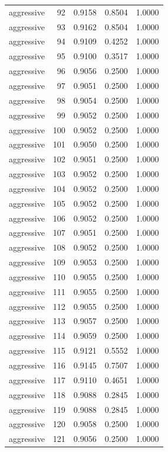 \begin{tabular}{lrrrr}
aggressive & 92 & 0.9158 & 0.8504 & 1.0000 \\
aggressive & 93 & 0.9162 & 0.8504 & 1.0000 \\
aggressive & 94 & 0.9109 & 0.4252 & 1.0000 \\
aggressive & 95 & 0.9100 & 0.3517 & 1.0000 \\
aggressive & 96 & 0.9056 & 0.2500 & 1.0000 \\
aggressive & 97 & 0.9051 & 0.2500 & 1.0000 \\
aggressive & 98 & 0.9054 & 0.2500 & 1.0000 \\
aggressive & 99 & 0.9052 & 0.2500 & 1.0000 \\
aggressive & 100 & 0.9052 & 0.2500 & 1.0000 \\
aggressive & 101 & 0.9050 & 0.2500 & 1.0000 \\
aggressive & 102 & 0.9051 & 0.2500 & 1.0000 \\
aggressive & 103 & 0.9052 & 0.2500 & 1.0000 \\
aggressive & 104 & 0.9052 & 0.2500 & 1.0000 \\
aggressive & 105 & 0.9052 & 0.2500 & 1.0000 \\
aggressive & 106 & 0.9052 & 0.2500 & 1.0000 \\
aggressive & 107 & 0.9051 & 0.2500 & 1.0000 \\
aggressive & 108 & 0.9052 & 0.2500 & 1.0000 \\
aggressive & 109 & 0.9053 & 0.2500 & 1.0000 \\
aggressive & 110 & 0.9055 & 0.2500 & 1.0000 \\
aggressive & 111 & 0.9055 & 0.2500 & 1.0000 \\
aggressive & 112 & 0.9055 & 0.2500 & 1.0000 \\
aggressive & 113 & 0.9057 & 0.2500 & 1.0000 \\
aggressive & 114 & 0.9059 & 0.2500 & 1.0000 \\
aggressive & 115 & 0.9121 & 0.5552 & 1.0000 \\
aggressive & 116 & 0.9145 & 0.7507 & 1.0000 \\
aggressive & 117 & 0.9110 & 0.4651 & 1.0000 \\
aggressive & 118 & 0.9088 & 0.2845 & 1.0000 \\
aggressive & 119 & 0.9088 & 0.2845 & 1.0000 \\
aggressive & 120 & 0.9058 & 0.2500 & 1.0000 \\
aggressive & 121 & 0.9056 & 0.2500 & 1.0000 \\

\end{tabular}
